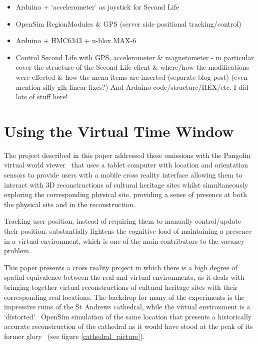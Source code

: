 \begin{itemize}
	\item Arduino + `accelerometer' as joystick for Second Life
	\item OpenSim RegionModules \& GPS (server side positional tracking/control)
	\item Arduino + HMC6343 + u-blox MAX-6
	\item Control Second Life with GPS, accelerometer \& magnetometer - in particular cover the structure of the Second Life client \& where/how the modifications were effected \& how the menu items are inserted (separate blog post) (even mention silly glh-linear fixes?) And Arduino code/structure/HEX/etc. I did lots of stuff here!
\end{itemize}


\section{Using the Virtual Time Window}













The project described in this paper addressed these omissions with the Pangolin virtual world viewer~\cite{Daviesa} that uses a tablet computer with location and orientation sensors to provide users with a mobile cross reality interface allowing them to interact with 3D reconstructions of cultural heritage sites whilst simultaneously exploring the corresponding physical site, providing a sense of presence at both the physical site and in the reconstruction.


Tracking user position, instead of requiring them to manually control/update their position. substantially lightens the cognitive load of maintaining a presence in a virtual environment, which is one of the main contributors to the vacancy problem.

This paper presents a cross reality project in which there is a high degree of spatial equivalence between the real and virtual environments, as it deals with bringing together virtual reconstructions of cultural heritage sites with their corresponding real locations. The backdrop for many of the experiments is the impressive ruins of the St Andrews cathedral, while the virtual environment is a `distorted'~\cite{lifton:merging} OpenSim simulation of the same location that presents a historically accurate reconstruction of the cathedral as it would have stood at the peak of its former glory~\cite{Kennedy2012, OpenVirtualWorldsgroupSchoolofComputerScience} (see figure \ref{cathedral_picture}).

